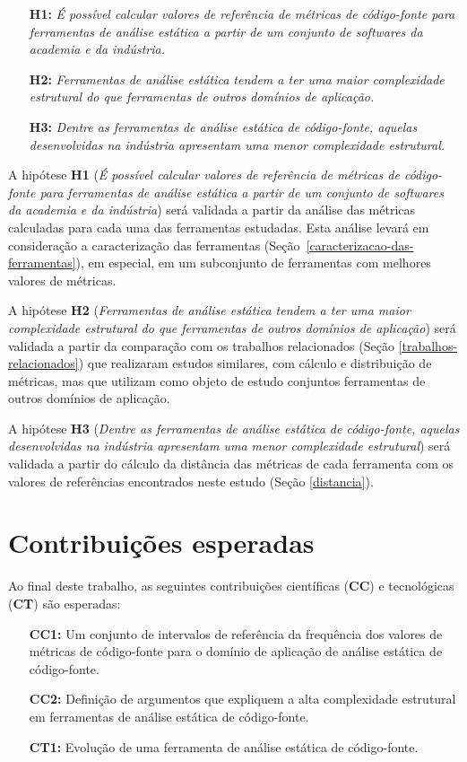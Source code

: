\begin{enumerate}
  \item[{\bf H1:}] {\em É possível calcular valores de referência de métricas
    de código-fonte para ferramentas de análise estática a partir de um
    conjunto de softwares da academia e da indústria.}
  \item[{\bf H2:}] {\em Ferramentas de análise estática tendem a ter uma
    maior complexidade estrutural do que ferramentas de outros domínios de
    aplicação.}
  \item[{\bf H3:}] {\em Dentre as ferramentas de análise estática de
    código-fonte, aquelas desenvolvidas na indústria apresentam uma menor
    complexidade estrutural.}
\end{enumerate}

A hipótese {\bf H1} ({\em É possível calcular valores de referência de
métricas de código-fonte para ferramentas de análise estática a partir de um
conjunto de softwares da academia e da indústria}) será validada a partir da
análise das métricas calculadas para cada uma das ferramentas estudadas.  Esta
análise levará em consideração a caracterização das ferramentas
(Seção~\ref{caracterizacao-das-ferramentas}), em especial, em um subconjunto
de ferramentas com melhores valores de métricas.

A hipótese {\bf H2} ({\em Ferramentas de análise estática tendem a ter uma
maior complexidade estrutural do que ferramentas de outros domínios de
aplicação}) será validada a partir da comparação com os trabalhos relacionados
(Seção \ref{trabalhos-relacionados}) que realizaram estudos similares, com
cálculo e distribuição de métricas, mas que utilizam como objeto de estudo
conjuntos ferramentas de outros domínios de aplicação.

A hipótese {\bf H3} ({\em Dentre as ferramentas de análise estática de
código-fonte, aquelas desenvolvidas na indústria apresentam uma menor
complexidade estrutural}) será validada a partir do cálculo da distância das
métricas de cada ferramenta com os valores de referências encontrados neste
estudo (Seção \ref{distancia}).


\section{Contribuições esperadas}

Ao final deste trabalho, as seguintes contribuições científicas ({\bf CC}) e
tecnológicas ({\bf CT}) são esperadas:

\begin{enumerate}
  \item [{\bf CC1:}] Um conjunto de intervalos de referência da frequência dos
    valores de métricas de código-fonte para o domínio de aplicação de
    análise estática de código-fonte.
  \item [{\bf CC2:}] Definição de argumentos que expliquem a alta complexidade
    estrutural em ferramentas de análise estática de código-fonte.
  \item [{\bf CT1:}] Evolução de uma ferramenta de análise estática de
    código-fonte.
\end{enumerate}

